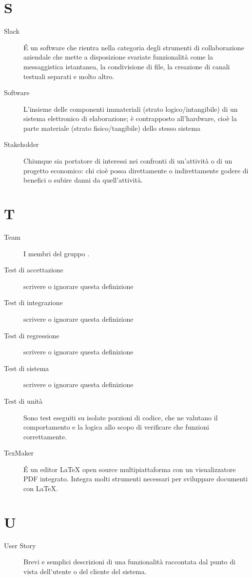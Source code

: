\documentclass[a4paper, oneside]{article}
\begin{document}
\section{S}
\begin{description}
  \item[Slack] É un software che rientra nella categoria degli strumenti di collaborazione aziendale che mette a disposizione svariate funzionalità come la messaggistica istantanea, la condivisione di file, la creazione di canali testuali separati e molto altro.
  \item[Software] L'insieme delle componenti immateriali (strato logico/intangibile) di un sistema elettronico di elaborazione; è contrapposto all'hardware, cioè la parte materiale (strato fisico/tangibile) dello stesso sistema
  \item[Stakeholder] Chiunque sia portatore di interessi nei confronti di un’attività o di un progetto economico: chi cioè possa direttamente o indirettamente godere di benefici o subire danni da quell’attività.
\end{description}
\newpage
\section{T}
\begin{description}
  \item[Team] I membri del gruppo \gruppo{}.
  \item[Test di accettazione] {scrivere o ignorare questa definizione}
  \item[Test di integrazione] {scrivere o ignorare questa definizione}
  \item[Test di regressione] {scrivere o ignorare questa definizione}
  \item[Test di sistema] {scrivere o ignorare questa definizione}
  \item[Test di unità] Sono test eseguiti su isolate porzioni di codice, che ne valutano il comportamento e la logica allo scopo di verificare che funzioni correttamente.
  \item[TexMaker] É un editor LaTeX open source multipiattaforma con un visualizzatore PDF integrato. Integra molti strumenti necessari per sviluppare documenti con LaTeX.
\end{description}
\newpage
\section{U}
\begin{description}
  \item[User Story] Brevi e semplici descrizioni di una funzionalità raccontata dal punto di vista dell’utente o del cliente del sistema.
\end{description}
\newpage
\end{document}
